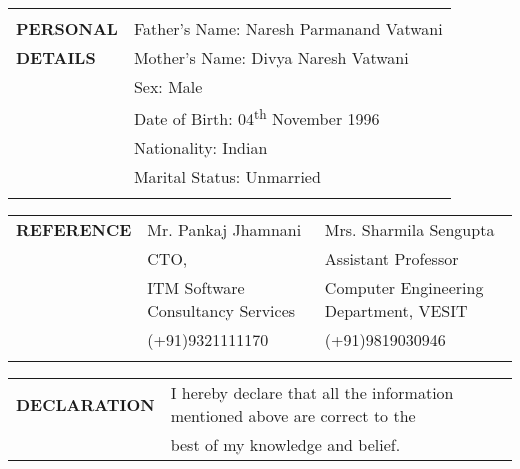 \documentclass[letterpaper,11pt,oneside]{article}
\begin{document}
\begin{tabular}{@{} l l}
		& \\
		\textbf{PERSONAL}    & \hspace{0.1cm}Father's Name: Naresh Parmanand Vatwani\\
		\textbf{DETAILS}    & \hspace{0.1cm}Mother's Name: Divya Naresh Vatwani \\
		&\hspace{0.1cm}Sex: Male\\
		&\hspace{0.1cm}Date of Birth: 04\textsuperscript{th} November 1996\\
		&\hspace{0.1cm}Nationality: Indian\\
		& \hspace{0.1cm}Marital Status: Unmarried\\
		\\
		
	\end{tabular}
		\noindent \begin{tabular}{@{} l l l}
			\textbf{REFERENCE} &\hspace{0.3cm}Mr. Pankaj Jhamnani & Mrs. Sharmila Sengupta \\
			& \hspace{0.3cm}CTO, &  Assistant Professor \\
			&\hspace{0.3cm}ITM Software Consultancy Services &  Computer Engineering Department, VESIT \\
			&\hspace{0.3cm}(+91)9321111170 & (+91)9819030946\\
			\\
		\end{tabular}
	\noindent \begin{tabular}{@{} l l}
			\textbf{DECLARATION}    & I hereby declare that all the information mentioned above are correct to the \\ &best of my knowledge and belief.\\ 	
			
		\end{tabular}
\end{document}
